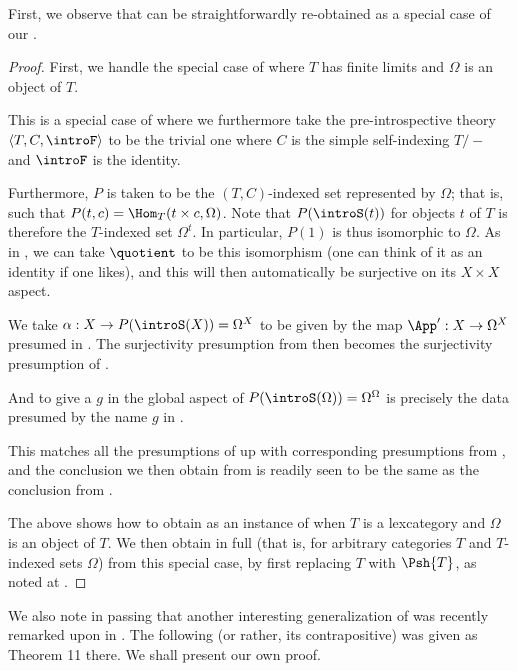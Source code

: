 First, we observe that  can be straightforwardly re-obtained as a special case of our .
\begin{proof}
First, we handle the special case of  where $T$ has finite limits and $\Omega$ is an object of $T$.

This is a special case of  where we furthermore take the pre-introspective theory $\langle T, C, \introF \rangle$ to be the trivial one where $C$ is the simple self-indexing $T/-$ and $\introF$ is the identity.

Furthermore, $P$ is taken to be the $(T, C)$-indexed set represented by $\Omega$; that is, such that $P(t, c) = \Hom_T(t \times c, \Omega)$. Note that $P(\introS(t))$ for objects $t$ of $T$ is therefore the $T$-indexed set $\Omega^t$. In particular, $P(1)$ is thus isomorphic to $\Omega$. As in , we can take $\quotient$ to be this isomorphism (one can think of it as an identity if one likes), and this will then automatically be surjective on its $X \times X$ aspect.

We take $\alpha : X \to P(\introS(X)) = \Omega^X$ to be given by the map $\App' : X \to \Omega^X$ presumed in . The surjectivity presumption from  then becomes the surjectivity presumption of . 

And to give a $g$ in the global aspect of $P(\introS(\Omega)) = \Omega^\Omega$ is precisely the data presumed by the name $g$ in .

This matches all the presumptions of  up with corresponding presumptions from , and the conclusion we then obtain from  is readily seen to be the same as the conclusion from .

The above shows how to obtain  as an instance of  when $T$ is a lexcategory and $\Omega$ is an object of $T$. We then obtain  in full (that is, for arbitrary categories $T$ and $T$-indexed sets $\Omega$) from this special case, by first replacing $T$ with $\Psh{T}$, as noted at .
\end{proof}

We also note in passing that another interesting generalization of  was recently remarked upon in \autocite{roberts2021substructural}. The following (or rather, its contrapositive) was given as Theorem 11 there. We shall present our own proof.

